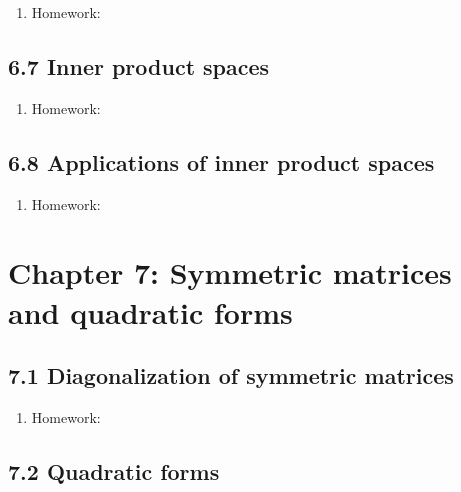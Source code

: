 \documentclass{article}
\begin{document}
\begin{enumerate}

\item Homework: 

\end{enumerate}

\subsection{6.7 Inner product spaces}

\begin{enumerate}

\item Homework: 

\end{enumerate}

\subsection{6.8 Applications of inner product spaces}

\begin{enumerate}

\item Homework: 

\end{enumerate}

\section{Chapter 7: Symmetric matrices and quadratic forms} 

\subsection{7.1 Diagonalization of symmetric matrices}

\begin{enumerate}

\item Homework: 

\end{enumerate}

\subsection{7.2 Quadratic forms}
\end{document}
